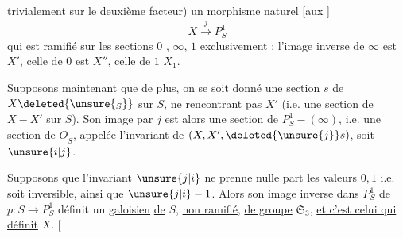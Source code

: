 trivialement sur le deuxième facteur) un morphisme naturel [aux ]
\[
X\xrightarrow{j}P^1_S
\]
qui est ramifié sur les sections $0$ \deleted{$\unsure{\infty}$}, $\infty$, $1$  exclusivement : l'image inverse de $\infty$ est $X'$, celle de $0$ est $X''$, celle de $1$  $X_1$.

Supposons maintenant que de plus, on se soit donné une section $s$ de $X\deleted{\unsure{_S}}$ sur $S$, ne rencontrant pas $X'$ (i.e. une section de $X-X'$ sur $S$). Son image par $j$ est alors une section de $P^1_S-(\infty)$, i.e. une section de $\underline O_S$, appelée \uline{l'invariant} de $(X,X',\deleted{\unsure{j}}s)$, soit  $\unsure{i|j}$.

Supposons que l'invariant $\unsure{j|i}$ ne prenne nulle part les valeurs $0,1$ i.e. soit inversible, ainsi que $\unsure{j|i}-1$. Alors son image inverse dans $P^1_S$  de $p:S\to P^1_S$ définit un   \uline{galoisien} \uline{de} $S$, \uline{non ramifié}, \uline{de groupe} $\mathfrak S_3$,  \uline{et c'est celui qui définit} $X$. [
